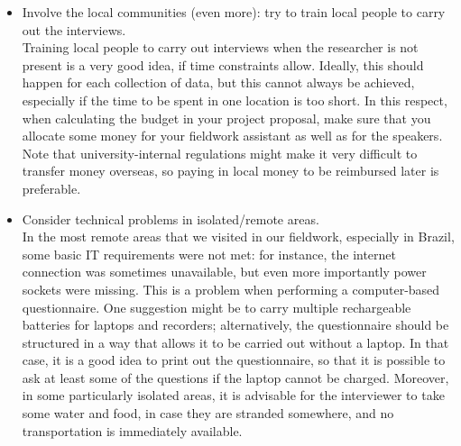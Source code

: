 \documentclass[output=paper,hidelinks]{langscibook}
\begin{document}
\begin{itemize}
Be it a secluded community in the Brazilian mountains or a dynamic community in Brooklyn, it is easier to access the speakers from within the local community. In particular, it is advisable to spend time participating in the life of the regional associations: parties are not only entertaining, but also an excellent means to meet people in a more relaxed environment than an interview offers, and to exchange contacts. In our case, we carried out pre-fieldwork in May as the fieldwork had to take place in the following spring.\footnote{A reviewer asks how many days are recommended. We do not have a precise answer for that: the more the better, obviously, so that the researcher can get to know the people and the community a little more. In our case, the pre-fieldwork lasted about 20 days, and the limit was determined by budget considerations rather than anything else.} 
\item Involve the local communities (even more): try to train local people to carry out the interviews.\\
Training local people to carry out interviews when the researcher is not present is a very good idea, if time constraints allow. Ideally, this should happen for each collection of data, but this cannot always be achieved, especially if the time to be spent in one location is too short. In this respect, when calculating the budget in your project proposal, make sure that you allocate some money for your fieldwork assistant as well as for the speakers. Note that university-internal regulations might make it very difficult to transfer money overseas, so paying in local money to be reimbursed later is preferable.
\item Consider technical problems in isolated/remote areas.\\
In the most remote areas that we visited in our fieldwork, especially in Brazil, some basic IT requirements were not met: for instance, the internet connection was sometimes unavailable, but even more importantly power sockets were missing. This is a problem when performing a computer-based questionnaire. One suggestion might be to carry multiple rechargeable batteries for laptops and recorders; alternatively, the questionnaire should be structured in a way that allows it to be carried out without a laptop. In that case, it is a good idea to print out the questionnaire, so that it is possible to ask at least some of the questions if the laptop cannot be charged. Moreover, in some particularly isolated areas, it is advisable for the interviewer to take some water and food, in case they are stranded somewhere, and no transportation is immediately available.

\end{itemize}
\end{document}
